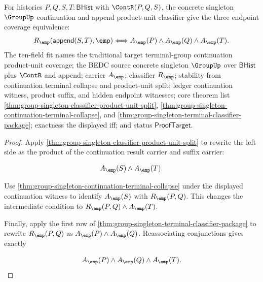 \begin{theorem}
\label{thm:group-singleton-continuation-product-unit-triple-coverage}
For histories $P,Q,S,T:\mathsf{BHist}$ with $\ContR(P,Q,S)$, the concrete
singleton $\GroupUp$ continuation and append product-unit classifier give the
three endpoint coverage equivalence:
$$
R_{\emp}(\mathsf{append}(S,T),\emp)\Longleftrightarrow
A_{\emp}(P)\land A_{\emp}(Q)\land A_{\emp}(T).
$$
The ten-field fit names the traditional target terminal-group continuation
product-unit coverage; the BEDC source concrete singleton $\GroupUp$ over
$\mathsf{BHist}$ plus $\ContR$ and append; carrier $A_{\emp}$; classifier
$R_{\emp}$; stability from continuation terminal collapse and product-unit
split; ledger continuation witness, product suffix, and hidden endpoint
witnesses; core theorem list
\autoref{thm:group-singleton-classifier-product-unit-split},
\autoref{thm:group-singleton-continuation-terminal-collapse}, and
\autoref{thm:group-singleton-terminal-classifier-package}; exactness the
displayed iff; and status $\mathsf{ProofTarget}$.
\end{theorem}
\begin{proof}
Apply \autoref{thm:group-singleton-classifier-product-unit-split} to rewrite the
left side as the product of the continuation result carrier and suffix carrier:

$$
A_{\emp}(S)\land A_{\emp}(T).
$$

Use \autoref{thm:group-singleton-continuation-terminal-collapse} under the
displayed continuation witness to identify $A_{\emp}(S)$ with
$R_{\emp}(P,Q)$. This changes the intermediate condition to
$R_{\emp}(P,Q)\land A_{\emp}(T)$.

Finally, apply the first row of
\autoref{thm:group-singleton-terminal-classifier-package} to rewrite
$R_{\emp}(P,Q)$ as $A_{\emp}(P)\land A_{\emp}(Q)$. Reassociating conjunctions
gives exactly

$$
A_{\emp}(P)\land A_{\emp}(Q)\land A_{\emp}(T).
$$
\end{proof}


